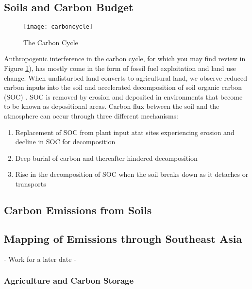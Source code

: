 \subsection{Soils and Carbon Budget}

\begin{figure}
\texttt{[image: carboncycle]}
\caption{The Carbon Cycle}
\label{fig:carboncycle2}
\end{figure}

Anthropogenic interference in the carbon cycle, for which you may find review in Figure \ref{fig:carboncycle2}), has mostly come in the form of fossil fuel exploitation and land use change. When undisturbed land converts to agricultural land, we observe reduced carbon inputs into the soil and accelerated decomposition of soil organic carbon (SOC) \citep{van2007impact}. SOC is removed by erosion and deposited in environments that become to be known as depositional areas. Carbon flux between the soil and the atmosphere can occur through three different mechanisms: 

\begin{enumerate}
  \item Replacement of SOC from plant input atat sites experiencing erosion and decline in SOC for decomposition
  \item Deep burial of carbon and thereafter hindered decomposition
  \item Rise in the decomposition of SOC when the soil breaks down as it detaches or transports
\end{enumerate}


\subsection{Carbon Emissions from Soils}

\subsection {Mapping of Emissions through Southeast Asia}
- Work for a later date -

\subsubsection{Agriculture and Carbon Storage}

